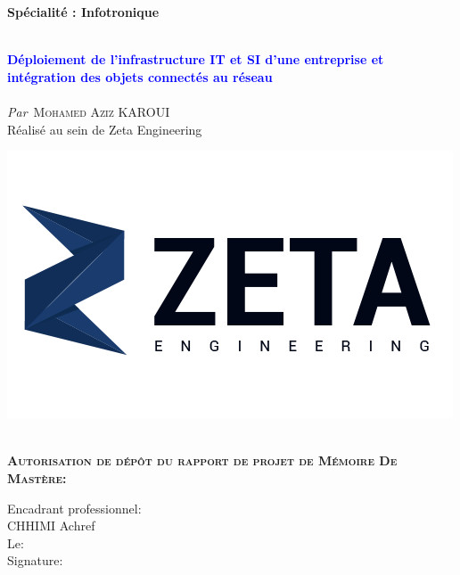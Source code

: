 \begin{titlepage}

\textbf{Spécialité : Infotronique}

\vskip1cm%


\HRule \\[0.4cm]
\textcolor{blue}{ \LARGE \bfseries Déploiement de l'infrastructure IT et SI d'une entreprise et intégration des objets connectés au réseau}\\[0.4cm] %
\HRule \\[1cm]


\textit{Par}\
\textsc{\large Mohamed Aziz KAROUI}\\[0.5cm] %


{Réalisé au sein de Zeta Engineering}\\
\smallskip

\includegraphics[width=0.4\columnwidth]{Images/logo-zeta.png}\

 

\begin{flushleft}
\textbf{\textsc{Autorisation de dépôt du rapport de projet de Mémoire De Mastère:}}\\[0.5cm] %
\vskip0.5cm
\begin{minipage}[c]{0.4\columnwidth}
Encadrant professionnel: \\ CHHIMI Achref \\

Le:\\

Signature:\\


\end{minipage}
\end{flushleft}
\end{titlepage}

